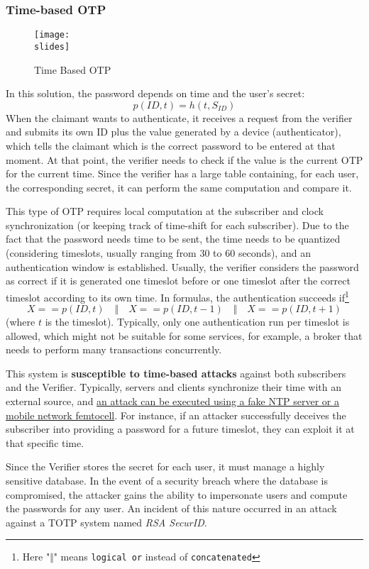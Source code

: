 \subsubsection{Time-based OTP}
\begin{figure}[h]
  \centering
  \texttt{[image: \\slides]}
  \caption{Time Based OTP}
\end{figure}
In this solution, the password depends on time and the user's secret: 
\[p(ID, t) = h(t, S_{ID})\] 
When the claimant wants to authenticate, it receives a request from the verifier and submits its own ID plus the value generated by a device (authenticator), which tells the claimant which is the correct password to be entered at that moment. At that point, the verifier needs to check if the value is the current OTP for the current time. Since the verifier has a large table containing, for each user, the corresponding secret, it can perform the same computation and compare it.

This type of OTP requires local computation at the subscriber and clock synchronization (or keeping track of time-shift for each subscriber). Due to the fact that the password needs time to be sent, the time needs to be quantized (considering timeslots, usually ranging from 30 to 60 seconds), and an authentication window is established. Usually, the verifier considers the password as correct if it is generated one timeslot before or one timeslot after the correct timeslot according to its own time. In formulas, the authentication succeeds if\footnote{Here "$\Vert$" means \texttt{logical or} instead of \texttt{concatenated}} 
\[
X == p(ID, t) \quad \Vert \quad 
X == p(ID, t - 1) 
\quad \Vert \quad X == p(ID, t + 1)
\] 
(where \(t\) is the timeslot). Typically, only one authentication run per timeslot is allowed, which might not be suitable for some services, for example, a broker that needs to perform many transactions concurrently.

This system is \textbf{susceptible to time-based attacks} against both subscribers and the Verifier. Typically, servers and clients synchronize their time with an external source, and \ul{an attack can be executed using a fake NTP server or a mobile network femtocell}. For instance, if an attacker successfully deceives the subscriber into providing a password for a future timeslot, they can exploit it at that specific time.

Since the Verifier stores the secret for each user, it must manage a highly sensitive database. In the event of a security breach where the database is compromised, the attacker gains the ability to impersonate users and compute the passwords for any user. An incident of this nature occurred in an attack against a TOTP system named \textit{RSA SecurID}.

